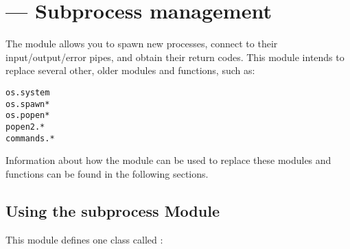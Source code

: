 \section{ --- Subprocess management}



The  module allows you to spawn new processes,
connect to their input/output/error pipes, and obtain their return
codes.  This module intends to replace several other, older modules
and functions, such as:


\begin{verbatim}
os.system
os.spawn*
os.popen*
popen2.*
commands.*
\end{verbatim}

Information about how the  module can be used to
replace these modules and functions can be found in the following
sections.

\subsection{Using the subprocess Module}

This module defines one class called :

